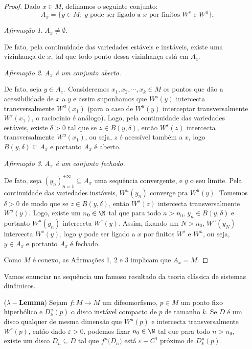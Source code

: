 \begin{proof} Dado $x\in M$, definamos o seguinte conjunto: $$A_x=\big\{y\in M;\ y\text{ pode ser ligado a }x\text{ por finitos }W^s\text{ e }W^u\big\}.$$

\textit{Afirmação 1}. $A_x\neq\emptyset$.

De fato, pela continuidade das variedades estáveis e instáveis, existe uma vizinhança de $x$, tal que todo ponto dessa vizinhança está em $A_x$.

\textit{Afirmação 2}. \textit{$A_x$ é um conjunto aberto.} 

De fato, seja $y\in A_x$. Consideremos $x_1,x_2,\cdots,x_k\in M$ os pontos que dão a acessibilidade de $x$ a $y$ e assim suponhamos que $W^s(y)$ intercecta transversalmente $W^u(x_1)$ (para o caso de $W^u(y)$ interceptar transversalmente $W^s(x_1)$, o raciocínio é análogo). Logo, pela continuidade das variedades estáveis, existe $\delta>0$ tal que se $z\in B(y,\delta)$, então $W^s(z)$ intercecta transversalmente $W^u(x_1)$, ou seja, $z$ é acessível também a $x$, logo $B(y,\delta)\subseteq A_x$ e portanto $A_x$ é aberto.

\textit{Afirmação 3}. \textit{$A_x$ é um conjunto fechado.} 

De fato, seja $(y_n)_{n=1}^{+\infty}\subseteq A_x$ uma sequência convergente, e $y$ o seu limite. Pela continuidade das variedades instáveis, $W^u(y_n)$ converge pra $W^u(y)$. Tomemos $\delta>0$ de modo que se $z\in B(y,\delta)$, então $W^s(z)$ intercecta transversalmente $W^u(y)$. Logo, existe um $n_0\in\N$  tal que para todo $n>n_0$, $y_n\in B(y,\delta)$ e portanto $W^u(y_n)$ intercecta $W^s(y)$. Assim, fixando um $N>n_0$, $W^u(y_N)$ intercecta $W^s(y)$, logo $y$ pode ser ligado a $x$ por finitos $W^s$ e $W^u$, ou seja, $y\in A_x$ e portanto $A_x$ é fechado.


Como $M$ é conexo, as Afirmações 1, 2 e 3 implicam que $A_x=M$.
\end{proof}

Vamos enunciar na sequência um famoso resultado da teoria clássica de sistemas dinâmicos.

\begin{teorema}\label{lambdalema}(\textbf{$\lambda-$Lemma}) Sejam $f:M\to M$ um difeomorfismo, $p\in M$ um ponto fixo hiperbólico e $D^{u}_k(p)$ o disco instável compacto de $p$ de tamanho $k$. Se $D$ é um disco qualquer de mesma dimensão que $W^u(p)$ e intercecta transversalmente $W^s(p)$, então dado $\varepsilon>0$, podemos fixar $n_0\in\N$ tal que para todo $n>n_0$, existe um disco $D_n\subseteq D$ tal que $f^n\big(D_n\big)$ está $\varepsilon-C^1$ próximo de $D^u_k(p)$.	
\end{teorema}

